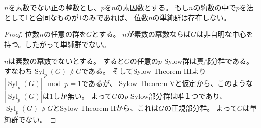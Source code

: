 \documentclass[a4paper]{jsarticle}
\newcommand{\Syl}{\operatorname{Syl}}
\begin{document}
    \begin{Prop}
        $n$を素数でない正の整数とし、$p$を$n$の素因数とする。
        もし$n$の約数の中で$p$を法として1と合同なものが$1$のみであれば、
        位数$n$の単純群は存在しない。
    \end{Prop}
    \begin{proof}
        位数$n$の任意の群を$G$とする。
        $n$が素数の冪数ならば$G$は非自明な中心を持つ。したがって単純群でない。

        $n$は素数の冪数でないとする。
        すると$G$の任意の$p$-Sylow群は真部分群である。すなわち$\Syl_p(G) \not \ni G$である。
        そしてSylow Theorem IIIより$|\Syl_p(G)| \mod p=1$であるが、
        Sylow Theorem Vと仮定から、このような$|\Syl_p(G)|$は1しか無い。
        よって$G$の$p$-Sylow部分群は唯１つであり、
        $\Syl_p(G) \not \ni G$とSylow Theorem IIから、これは$G$の正規部分群。
        よって$G$は単純群でない。
    \end{proof}
\end{document}
